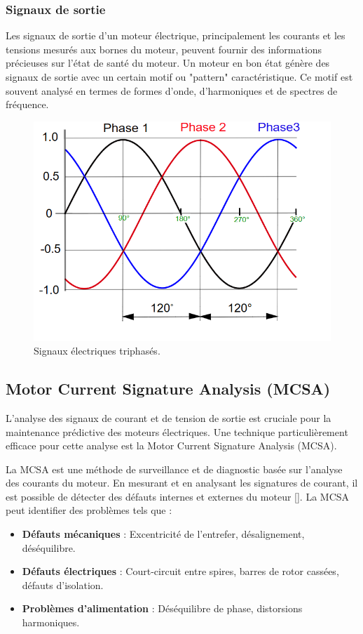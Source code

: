 \subsubsection*{Signaux de sortie}

Les signaux de sortie d'un moteur électrique, principalement les courants et
les tensions mesurés aux bornes du moteur, peuvent fournir des informations
précieuses sur l'état de santé du moteur. Un moteur en bon état génère des
signaux de sortie avec un certain motif ou "pattern" caractéristique. Ce motif
est souvent analysé en termes de formes d'onde, d'harmoniques et de spectres de
fréquence.

\begin{figure}[hbt!]
	\centering
	\includegraphics[width=12cm]{images_pfe/triphase.png}
	\caption{
		Signaux électriques triphasés.}
	\label{fig:moteur-asynchrone-tri}
\end{figure}
\FloatBarrier

\subsection*{Motor Current Signature Analysis (MCSA)}

L'analyse des signaux de courant et de tension de sortie est cruciale pour la
maintenance prédictive des moteurs électriques. Une technique particulièrement
efficace pour cette analyse est la Motor Current Signature Analysis (MCSA).

La MCSA est une méthode de surveillance et de diagnostic basée sur l'analyse
des courants du moteur. En mesurant et en analysant les signatures de courant,
il est possible de détecter des défauts internes et externes du moteur
	[\cite{bonetjara2023sensorless}]. La MCSA peut identifier des problèmes tels
que :
\begin{itemize}
	\item \textbf{Défauts mécaniques} : Excentricité de l'entrefer, désalignement, déséquilibre.
	\item \textbf{Défauts électriques} : Court-circuit entre spires, barres de rotor cassées, défauts d'isolation.
	\item \textbf{Problèmes d'alimentation} : Déséquilibre de phase, distorsions harmoniques.
\end{itemize}

